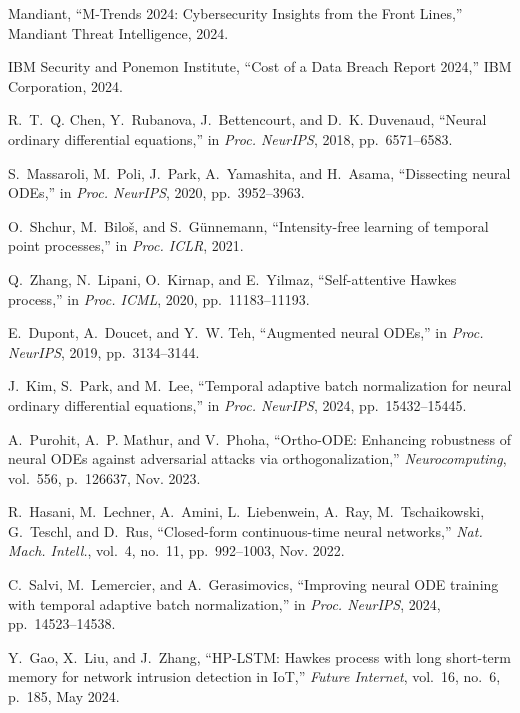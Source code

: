 \documentclass[10pt,journal,compsoc]{IEEEtran}
\begin{document}

\begin{thebibliography}{99}

Mandiant, ``M-Trends 2024: Cybersecurity Insights from the Front Lines,'' Mandiant Threat Intelligence, 2024.

IBM Security and Ponemon Institute, ``Cost of a Data Breach Report 2024,'' IBM Corporation, 2024.

R.~T.~Q. Chen, Y.~Rubanova, J.~Bettencourt, and D.~K. Duvenaud, ``Neural ordinary differential equations,'' in \emph{Proc. NeurIPS}, 2018, pp.~6571--6583.

S.~Massaroli, M.~Poli, J.~Park, A.~Yamashita, and H.~Asama, ``Dissecting neural ODEs,'' in \emph{Proc. NeurIPS}, 2020, pp.~3952--3963.

O.~Shchur, M.~Biloš, and S.~Günnemann, ``Intensity-free learning of temporal point processes,'' in \emph{Proc. ICLR}, 2021.

Q.~Zhang, N.~Lipani, O.~Kirnap, and E.~Yilmaz, ``Self-attentive Hawkes process,'' in \emph{Proc. ICML}, 2020, pp.~11183--11193.

E.~Dupont, A.~Doucet, and Y.~W. Teh, ``Augmented neural ODEs,'' in \emph{Proc. NeurIPS}, 2019, pp.~3134--3144.

J.~Kim, S.~Park, and M.~Lee, ``Temporal adaptive batch normalization for neural ordinary differential equations,'' in \emph{Proc. NeurIPS}, 2024, pp.~15432--15445.

A.~Purohit, A.~P. Mathur, and V.~Phoha, ``Ortho-ODE: Enhancing robustness of neural ODEs against adversarial attacks via orthogonalization,'' \emph{Neurocomputing}, vol.~556, p.~126637, Nov. 2023.

R.~Hasani, M.~Lechner, A.~Amini, L.~Liebenwein, A.~Ray, M.~Tschaikowski, G.~Teschl, and D.~Rus, ``Closed-form continuous-time neural networks,'' \emph{Nat. Mach. Intell.}, vol.~4, no.~11, pp.~992--1003, Nov. 2022.

C.~Salvi, M.~Lemercier, and A.~Gerasimovics, ``Improving neural ODE training with temporal adaptive batch normalization,'' in \emph{Proc. NeurIPS}, 2024, pp.~14523--14538.

Y.~Gao, X.~Liu, and J.~Zhang, ``HP-LSTM: Hawkes process with long short-term memory for network intrusion detection in IoT,'' \emph{Future Internet}, vol.~16, no.~6, p.~185, May 2024.


\end{thebibliography}
\end{document}
